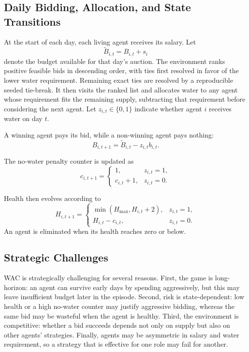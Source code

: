 \documentclass[letterpaper]{article} %
\begin{document}
\subsection{Daily Bidding, Allocation, and State Transitions}

At the start of each day, each living agent receives its
salary. Let
\begin{equation}
    \widetilde{B}_{i,t}=B_{i,t}+s_i
\end{equation}
denote the budget available for that day's auction.
The environment ranks positive feasible bids in descending order, with
ties first resolved in favor of the lower water requirement. Remaining
exact ties are resolved by a reproducible seeded tie-break. It then visits
the ranked list and allocates water to any agent whose requirement fits the
remaining supply, subtracting that requirement before considering the next
agent. Let $z_{i,t}\in\{0,1\}$ indicate whether agent $i$ receives water
on day $t$.

A winning agent pays its bid, while a non-winning agent pays
nothing:
\begin{equation}
    B_{i,t+1}
    =
    \widetilde{B}_{i,t}-z_{i,t}b_{i,t}.
\end{equation}

The no-water penalty counter is updated as
\begin{equation}
    c_{i,t+1}
    =
    \begin{cases}
        1, & z_{i,t}=1,\\
        c_{i,t}+1, & z_{i,t}=0.
    \end{cases}
\end{equation}

Health then evolves according to
\begin{equation}
    H_{i,t+1}
    =
    \begin{cases}
        \min(H_{\max},H_{i,t}+2), & z_{i,t}=1,\\
        H_{i,t}-c_{i,t}, & z_{i,t}=0.
    \end{cases}
\end{equation}
An agent is eliminated when its health reaches zero or below.

\subsection{Strategic Challenges}

WAC is strategically challenging for several reasons. First, the game is long-horizon: an agent can survive early days by spending aggressively, but this may leave insufficient budget later in the episode. Second, risk is state-dependent: low health or a high no-water counter may justify aggressive bidding, whereas the same bid may be wasteful when the agent is healthy. Third, the environment is competitive: whether a bid succeeds depends not only on supply but also on other agents' strategies. Finally, agents may be asymmetric in salary and water requirement, so a strategy that is effective for one role may fail for another.
\end{document}
